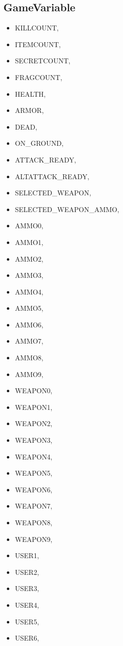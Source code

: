 \subsection{GameVariable}
\begin{itemize}
\item KILLCOUNT,
\item        ITEMCOUNT,
\item        SECRETCOUNT,
\item        FRAGCOUNT,
\item        HEALTH,
\item        ARMOR,
\item        DEAD,
\item        ON\_GROUND,
\item        ATTACK\_READY,
\item        ALTATTACK\_READY,
 \item       SELECTED\_WEAPON,
\item      SELECTED\_WEAPON\_AMMO,
 \item       AMMO0,
\item        AMMO1,
\item        AMMO2,
\item        AMMO3,
 \item       AMMO4,
 \item       AMMO5,
 \item       AMMO6,
 \item       AMMO7,
\item       AMMO8,
\item        AMMO9,
 \item       WEAPON0,
 \item       WEAPON1,
\item        WEAPON2,
 \item       WEAPON3,
 \item       WEAPON4,
 \item       WEAPON5,
\item        WEAPON6,
\item        WEAPON7,
\item        WEAPON8,
\item        WEAPON9,
 \item       USER1,
 \item       USER2,
 \item       USER3,
 \item       USER4,
 \item       USER5,
\item        USER6,

\end{itemize}
